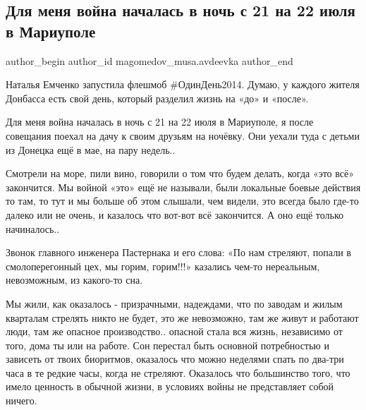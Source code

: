  
 
 
 
 
 
\subsection{Для меня война началась в ночь с 21 на 22 июля в Мариуполе}
\label{sec:08_10_2021.fb.magomedov_musa.avdeevka.1.vojna}
 
\ifcmt
 author_begin
   author_id magomedov_musa.avdeevka
 author_end
\fi

Наталья Емченко запустила флешмоб \#ОдинДень2014. Думаю, у каждого жителя
Донбасса есть свой день, который разделил жизнь на «до» и «после».

Для меня война началась в ночь с 21 на 22 июля в Мариуполе, я после совещания
поехал на дачу к своим друзьям на ночёвку. Они уехали туда с детьми из Донецка
ещё в мае, на пару недель..


Смотрели на море, пили вино, говорили о том что будем делать, когда «это всё»
закончится. Мы войной «это» ещё не называли, были локальные боевые действия то
там, то тут и мы больше об этом слышали, чем видели, это всегда было где-то
далеко или не очень, и казалось что вот-вот всё закончится. А оно ещё только
начиналось..

Звонок главного инженера Пастернака и его слова: «По нам стреляют, попали в
смолоперегонный цех, мы горим, горим!!!» казались чем-то нереальным,
невозможным, из какого-то сна. 


Мы жили, как оказалось - призрачными, надеждами, что по заводам и жилым
кварталам стрелять никто не будет, это же невозможно, там же живут и работают
люди, там же опасное производство.. опасной стала вся жизнь, независимо от
того, дома ты или на работе. Сон перестал быть основной потребностью и зависеть
от твоих биоритмов, оказалось что можно неделями спать по два-три часа в те
редкие часы, когда не стреляют. Оказалось что большинство того, что имело
ценность в обычной жизни, в условиях войны не представляет собой ничего. 

